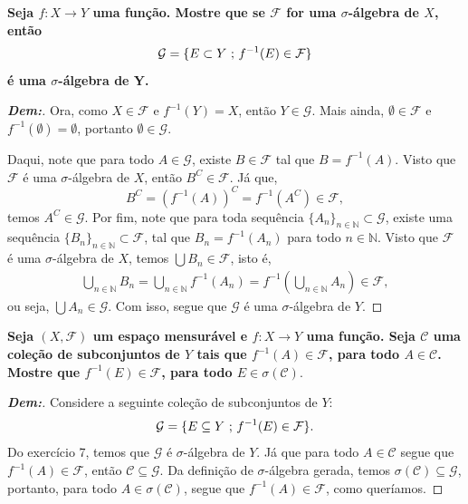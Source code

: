 \biglinend
{}
\bigline
\textbf{Seja $f:X \rightarrow Y$ uma função. Mostre que se $\mathcal F$ 
for uma $\sigma$-álgebra de $X$, então 
$$\mathcal G = \{E \subset Y\text{ ; }  f^{-1}(E)\in \mathcal F\}$$ 
é uma $\sigma$-álgebra de Y.
}
\begin{proof}[\textbf{Dem:}]
  Ora, como $X \in \mathcal F$ e $f^{-1}(Y) = X$, então $Y \in \mathcal G$. Mais ainda, 
  $\emptyset \in \mathcal F$ e $f^{-1}(\emptyset) = \emptyset$, portanto $\emptyset \in \mathcal G$.

  Daqui, note que para todo $A \in \mathcal G$, existe $B \in \mathcal F$ tal que $B = f^{-1}(A)$. 
  Visto que $\mathcal F$ é uma $\sigma$-álgebra de $X$, então $B^C \in \mathcal F$. Já que, 
  $$B^C = (f^{-1}(A))^C = f^{-1}\left(A^C\right) \in \mathcal F,$$
  temos $A^C \in \mathcal G$. Por fim, note que para toda sequência $\{A_n\}_{n\in \mathbb N} \subset \mathcal G$,
  existe uma sequência $\{B_n\}_{n \in \mathbb N} \subset \mathcal F$, tal que
  $B_n = f^{-1}(A_n)$ para todo $n \in \mathbb N$. Visto que $\mathcal F$ é uma $\sigma$-álgebra de $X$, temos 
  $\bigcup B_n \in \mathcal F$, isto é,
  \begin{align*}
    \bigcup\limits_{n \in \mathbb N} B_n = \bigcup\limits_{n \in \mathbb N} f^{-1}(A_n) = 
    f^{-1}\left(\bigcup\limits_{n \in \mathbb N} A_n\right) \in \mathcal F,
  \end{align*}
 ou seja, $\bigcup A_n \in \mathcal G$. Com isso, segue que $\mathcal G$ é uma $\sigma$-álgebra de $Y$.
\end{proof}

\biglinend
\newpage
{}
\bigline
\textbf{Seja $(X, \mathcal F)$ um espaço mensurável e $f: X \rightarrow Y$ uma função. Seja $\mathcal C$ uma coleção de 
subconjuntos de $Y$ tais que $f^{-1}(A) \in \mathcal F$, para todo $A \in \mathcal C$. Mostre que $f^{-1}(E) \in \mathcal F$, 
para todo $E \in \sigma(\mathcal C)$}.
\begin{proof}[\textbf{Dem:}] Considere a seguinte coleção de subconjuntos de $Y$:
  \begin{align*}
    \mathcal G = \{E\subseteq Y\text{ ; }  f^{-1}(E) \in \mathcal F\}.
  \end{align*}
  Do exercício 7, temos que $\mathcal G$ é $\sigma$-álgebra de $Y$. Já que 
  para todo $A \in \mathcal C$ segue que $f^{-1}(A) \in \mathcal F$,
  então $\mathcal C \subseteq \mathcal G$. Da definição de $\sigma$-álgebra gerada, 
  temos $\sigma(\mathcal C) \subseteq \mathcal G$, portanto, para todo 
  $A \in \sigma(\mathcal C)$, segue que $f^{-1}(A) \in \mathcal F$, como queríamos. 
\end{proof}


